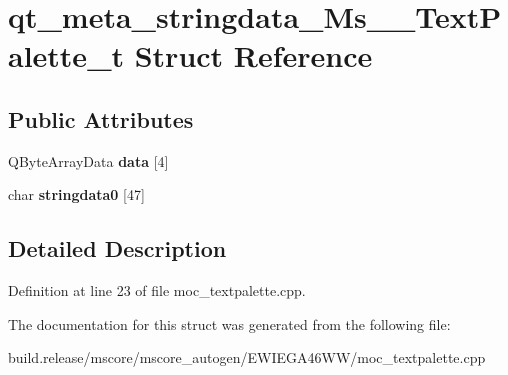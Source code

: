 \hypertarget{structqt__meta__stringdata___ms_____text_palette__t}{}\section{qt\+\_\+meta\+\_\+stringdata\+\_\+\+Ms\+\_\+\+\_\+\+Text\+Palette\+\_\+t Struct Reference}
\label{structqt__meta__stringdata___ms_____text_palette__t}
\subsection*{Public Attributes}
\begin{DoxyCompactItemize}
\item 
\mbox{\label{structqt__meta__stringdata___ms_____text_palette__t_a5980a354e754393aad4195821ffa84b2}} 
Q\+Byte\+Array\+Data {\bfseries data} \mbox{[}4\mbox{]}
\item 
\mbox{\label{structqt__meta__stringdata___ms_____text_palette__t_ae0f61b132564a35dd93d3783a0e75a18}} 
char {\bfseries stringdata0} \mbox{[}47\mbox{]}
\end{DoxyCompactItemize}


\subsection{Detailed Description}


Definition at line 23 of file moc\+\_\+textpalette.\+cpp.



The documentation for this struct was generated from the following file\+:\begin{DoxyCompactItemize}
\item 
build.\+release/mscore/mscore\+\_\+autogen/\+E\+W\+I\+E\+G\+A46\+W\+W/moc\+\_\+textpalette.\+cpp\end{DoxyCompactItemize}
